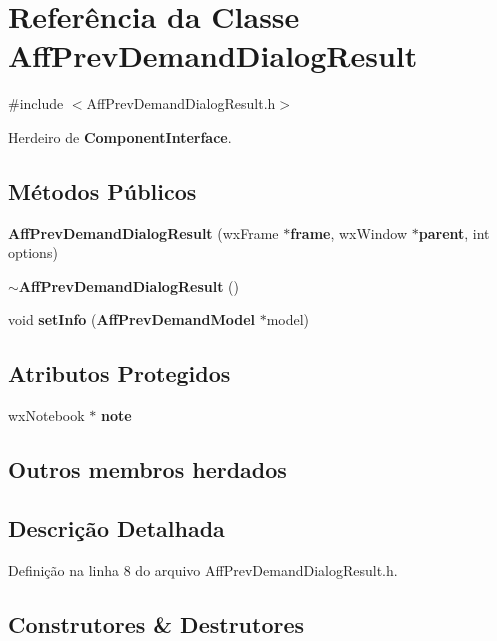 \section{Referência da Classe Aff\+Prev\+Demand\+Dialog\+Result}
\label{class_aff_prev_demand_dialog_result}


{\ttfamily \#include $<$Aff\+Prev\+Demand\+Dialog\+Result.\+h$>$}



Herdeiro de {\bf Component\+Interface}.

\subsection*{Métodos Públicos}
\begin{DoxyCompactItemize}
\item 
{\bf Aff\+Prev\+Demand\+Dialog\+Result} (wx\+Frame $\ast${\bf frame}, wx\+Window $\ast${\bf parent}, int options)
\item 
{\bf $\sim$\+Aff\+Prev\+Demand\+Dialog\+Result} ()
\item 
void {\bf set\+Info} ({\bf Aff\+Prev\+Demand\+Model} $\ast$model)
\end{DoxyCompactItemize}
\subsection*{Atributos Protegidos}
\begin{DoxyCompactItemize}
\item 
wx\+Notebook $\ast$ {\bf note}
\end{DoxyCompactItemize}
\subsection*{Outros membros herdados}


\subsection{Descrição Detalhada}


Definição na linha 8 do arquivo Aff\+Prev\+Demand\+Dialog\+Result.\+h.



\subsection{Construtores \& Destrutores}
